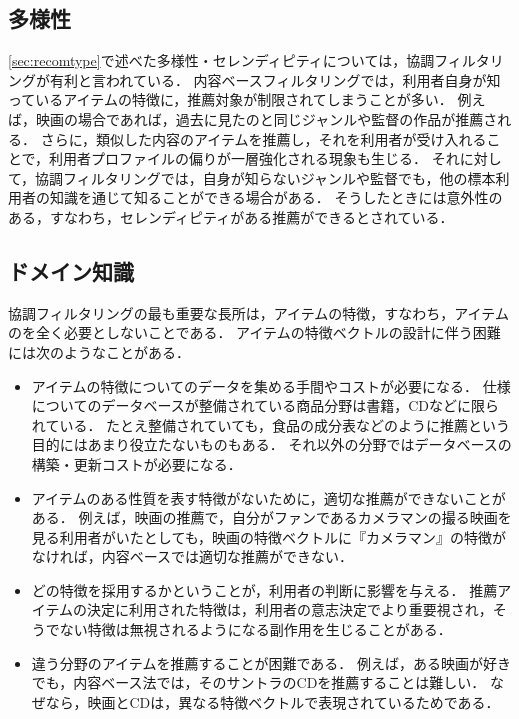 \subsection{多様性}

\ref{sec:recomtype}で述べた多様性・セレンディピティについては，協調フィルタリングが有利と言われている．
内容ベースフィルタリングでは，利用者自身が知っているアイテムの特徴に，推薦対象が制限されてしまうことが多い．
例えば，映画の場合であれば，過去に見たのと同じジャンルや監督の作品が推薦される．
さらに，類似した内容のアイテムを推薦し，それを利用者が受け入れることで，利用者プロファイルの偏りが一層強化される現象も生じる．
それに対して，協調フィルタリングでは，自身が知らないジャンルや監督でも，他の標本利用者の知識を通じて知ることができる場合がある．
そうしたときには意外性のある，すなわち，セレンディピティがある推薦ができるとされている．

\subsection{ドメイン知識}

協調フィルタリングの最も重要な長所は，アイテムの特徴，すなわち，アイテムのを全く必要としないことである．
アイテムの特徴ベクトルの設計に伴う困難には次のようなことがある．
\begin{itemize}
 \item
アイテムの特徴についてのデータを集める手間やコストが必要になる．
仕様についてのデータベースが整備されている商品分野は書籍，CDなどに限られている．
たとえ整備されていても，食品の成分表などのように推薦という目的にはあまり役立たないものもある．
それ以外の分野ではデータベースの構築・更新コストが必要になる．
 \item
 アイテムのある性質を表す特徴がないために，適切な推薦ができないことがある．
 例えば，映画の推薦で，自分がファンであるカメラマンの撮る映画を見る利用者がいたとしても，映画の特徴ベクトルに『カメラマン』の特徴がなければ，内容ベースでは適切な推薦ができない．
 \item
 どの特徴を採用するかということが，利用者の判断に影響を与える．
推薦アイテムの決定に利用された特徴は，利用者の意志決定でより重要視され，そうでない特徴は無視されるようになる副作用を生じることがある\cite{ec:029}．
 \item
 違う分野のアイテムを推薦することが困難である．
 例えば，ある映画が好きでも，内容ベース法では，そのサントラのCDを推薦することは難しい．
 なぜなら，映画とCDは，異なる特徴ベクトルで表現されているためである．
\end{itemize}

